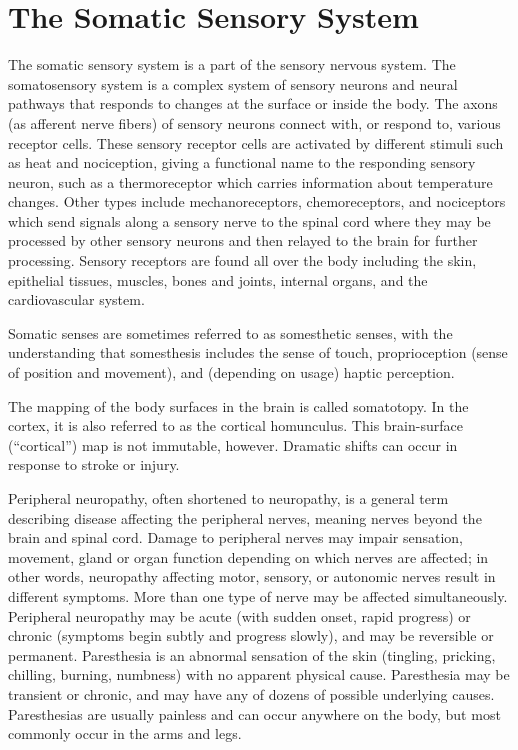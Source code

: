\hypertarget{the-somatic-sensory-system}{%
\chapter{The Somatic Sensory System}\label{the-somatic-sensory-system}}

The somatic sensory system is a part of the sensory nervous system. The somatosensory system is a complex system of sensory neurons and neural pathways that responds to changes at the surface or inside the body. The axons (as afferent nerve fibers) of sensory neurons connect with, or respond to, various receptor cells. These sensory receptor cells are activated by different stimuli such as heat and nociception, giving a functional name to the responding sensory neuron, such as a thermoreceptor which carries information about temperature changes. Other types include mechanoreceptors, chemoreceptors, and nociceptors which send signals along a sensory nerve to the spinal cord where they may be processed by other sensory neurons and then relayed to the brain for further processing. Sensory receptors are found all over the body including the skin, epithelial tissues, muscles, bones and joints, internal organs, and the cardiovascular system.

Somatic senses are sometimes referred to as somesthetic senses, with the understanding that somesthesis includes the sense of touch, proprioception (sense of position and movement), and (depending on usage) haptic perception.

The mapping of the body surfaces in the brain is called somatotopy. In the cortex, it is also referred to as the cortical homunculus. This brain-surface (``cortical'') map is not immutable, however. Dramatic shifts can occur in response to stroke or injury.

Peripheral neuropathy, often shortened to neuropathy, is a general term describing disease affecting the peripheral nerves, meaning nerves beyond the brain and spinal cord. Damage to peripheral nerves may impair sensation, movement, gland or organ function depending on which nerves are affected; in other words, neuropathy affecting motor, sensory, or autonomic nerves result in different symptoms. More than one type of nerve may be affected simultaneously. Peripheral neuropathy may be acute (with sudden onset, rapid progress) or chronic (symptoms begin subtly and progress slowly), and may be reversible or permanent. Paresthesia is an abnormal sensation of the skin (tingling, pricking, chilling, burning, numbness) with no apparent physical cause. Paresthesia may be transient or chronic, and may have any of dozens of possible underlying causes. Paresthesias are usually painless and can occur anywhere on the body, but most commonly occur in the arms and legs.

